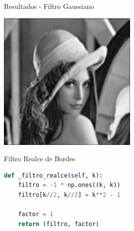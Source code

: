 \documentclass{beamer}
\begin{document}
\begin{frame}[fragile]{Resultados - Filtro Gaussiano}
\begin{minipage}{0.32\linewidth}
		\label{fig:lenaej10d1}
	\end{minipage}\hfill
	\begin{minipage}{0.32\linewidth}
		\centering
		\includegraphics[width=\linewidth]{../results/lena_ej10d2}
		\label{fig:lenaej10d2}
	\end{minipage}
\end{frame}


\begin{frame}[fragile]{Filtro Realce de Bordes}
	\justifying
	
	\begin{lstlisting}[language=Python]
def _filtro_realce(self, k):
	filtro = -1 * np.ones((k, k))
	filtro[k//2, k//2] = k**2 - 1
	
	factor = 1
	return (filtro, factor)
	\end{lstlisting}
\end{frame}
\end{document}
